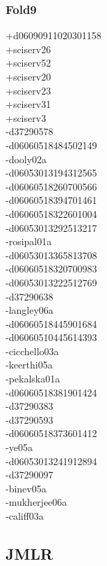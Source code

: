 \begin{multicols}{4}
\subsubsection*{Fold9}
+d06090911020301158\\
+sciserv26\\
+sciserv52\\
+sciserv20\\
+sciserv23\\
+sciserv31\\
+sciserv3\\
-d37290578\\
-d06060518484502149\\
-dooly02a\\
-d06053013194312565\\
-d06060518260700566\\
-d06060518394701461\\
-d06060518322601004\\
-d06053013292513217\\
-rosipal01a\\
-d06053013365813708\\
-d06060518320700983\\
-d06053013222512769\\
-d37290638\\
-langley06a\\
-d06060518445901684\\
-d06060510445614393\\
-cicchello03a\\
-keerthi05a\\
-pekalska01a\\
-d06060518381901424\\
-d37290383\\
-d37290593\\
-d06060518373601412\\
-ye05a\\
-d06053013241912894\\
-d37290097\\
-binev05a\\
-mukherjee06a\\
-califf03a

\clearpage
\subsection{JMLR}
\vspace{.5cm}


\end{multicols}
